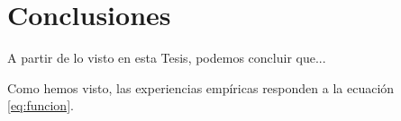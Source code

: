 \chapter{Conclusiones}

A partir de lo visto en esta Tesis, podemos concluir que...

Como hemos visto, las experiencias empíricas responden a la ecuación \ref{eq:funcion}.